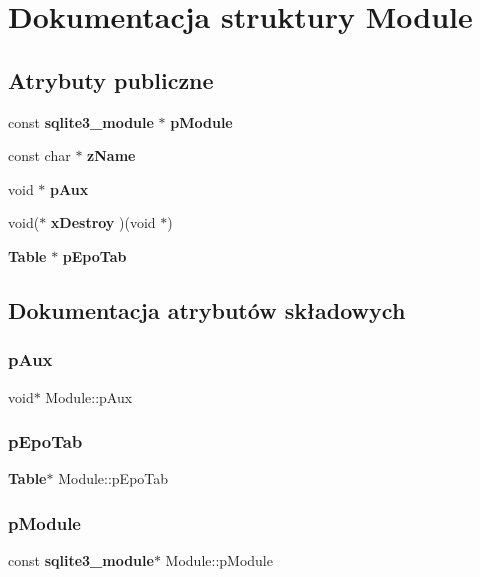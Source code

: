 \section{Dokumentacja struktury Module}
\label{struct_module}
\subsection*{Atrybuty publiczne}
\begin{DoxyCompactItemize}
\item 
const \textbf{ sqlite3\+\_\+module} $\ast$ \textbf{ p\+Module}
\item 
const char $\ast$ \textbf{ z\+Name}
\item 
void $\ast$ \textbf{ p\+Aux}
\item 
void($\ast$ \textbf{ x\+Destroy} )(void $\ast$)
\item 
\textbf{ Table} $\ast$ \textbf{ p\+Epo\+Tab}
\end{DoxyCompactItemize}


\subsection{Dokumentacja atrybutów składowych}
\mbox{\label{struct_module_ae3b827fee4c8b4f3ff38c86c2e2f48cd}} 
\subsubsection{pAux}
{\footnotesize\ttfamily void$\ast$ Module\+::p\+Aux}

\mbox{\label{struct_module_a546d1d825743f3083e7413f9f280d402}} 
\subsubsection{pEpoTab}
{\footnotesize\ttfamily \textbf{ Table}$\ast$ Module\+::p\+Epo\+Tab}

\mbox{\label{struct_module_a65d2539d71ea028b505b2fb33563bfd7}} 
\subsubsection{pModule}
{\footnotesize\ttfamily const \textbf{ sqlite3\+\_\+module}$\ast$ Module\+::p\+Module}

\mbox{\label{struct_module_a4a4b707d6ad852cf2e8d983d22886cc1}} 
